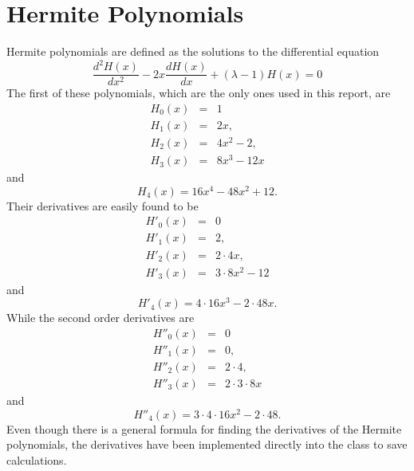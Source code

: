 \documentclass[aps,prb,twocolumn,floatfix]{revtex4}
\newcommand{\class}[1]{{\sffamily{#1}}}
\begin{document}
\section{Hermite Polynomials} \label{sec:hermite}

Hermite polynomials are defined as the solutions to the differential equation
\begin{equation}
    \frac{d^2 H(x)}{dx^2} - 2x \frac{dH(x)}{dx} + \left( \lambda - 1  \right) H(x) = 0
\end{equation} 
The first of these polynomials, which are the only ones used in this report, are
\begin{equation}
\begin{array}{rcl}
H_{0}(x) &=& 1 \\
H_{1}(x) &=& 2x, \\
H_{2}(x) &=& 4x^2 - 2, \\
H_{3}(x) &=& 8x^3 - 12x
\end{array}
\end{equation} 
and
\[H_{4}(x) = 16x^4 - 48x^2 + 12.\]
Their derivatives are easily found to be
\begin{equation}
\begin{array}{rcl}
H'_{0}(x) &=& 0 \\
H'_{1}(x) &=& 2, \\
H'_{2}(x) &=& 2\cdot 4x, \\
H'_{3}(x) &=& 3\cdot 8x^2 - 12
\end{array}
\end{equation} 
and
\[H'_{4}(x) = 4 \cdot  16 x^3 - 2\cdot48x.\]
While the second order derivatives are
\begin{equation}
\begin{array}{rcl}
H''_{0}(x) &=& 0 \\
H''_{1}(x) &=& 0, \\
H''_{2}(x) &=& 2\cdot 4, \\
H''_{3}(x) &=& 2\cdot 3\cdot 8x
\end{array}
\end{equation} 
and
\[H''_{4}(x) = 3 \cdot 4 \cdot 16x^2 - 2\cdot48 .\]
Even though there is a general formula for finding the derivatives of the Hermite polynomials, the derivatives have been implemented directly into the \class{Hermite} class to save calculations.

% 


\end{document}
